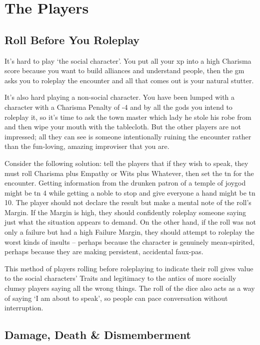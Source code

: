 \section{The Players}

\begin{multicols}{2}

\subsection{Roll Before You Roleplay}

It's hard to play `the social character'.
You put all your \gls{xp} into a high Charisma score because you want to build alliances and understand people, then the \gls{gm} asks you to roleplay the encounter and all that comes out is your natural stutter.

It's also hard playing a non-social character.
You have been lumped with a character with a Charisma Penalty of -4 and by all the gods you intend to roleplay it, so it's time to ask the town master which lady he stole his robe from and then wipe your mouth with the tablecloth.
But the other players are not impressed; all they can see is someone intentionally ruining the encounter rather than the fun-loving, amazing improviser that you are.

Consider the following solution: tell the players that if they wish to speak, they must roll Charisma plus Empathy or Wits plus Whatever, then set the \gls{tn} for the encounter.
Getting information from the drunken patron of a temple of \gls{joygod} might be \gls{tn} 4 while getting a noble to stop and give everyone a hand might be \gls{tn} 10.
The player should not declare the result but make a mental note of the roll's Margin.
If the Margin is high, they should confidently roleplay someone saying just what the situation appears to demand.
On the other hand, if the roll was not only a failure but had a high Failure Margin, they should attempt to roleplay the worst kinds of insults -- perhaps because the character is genuinely mean-spirited, perhaps because they are making persistent, accidental faux-pas.

This method of players rolling before roleplaying to indicate their roll gives value to the social characters' Traits and legitimacy to the antics of more socially clumsy players saying all the wrong things.
The roll of the dice also acts as a way of saying `I am about to speak', so people can pace conversation without interruption.

\subsection{Damage, Death \& Dismemberment}


\end{multicols}
